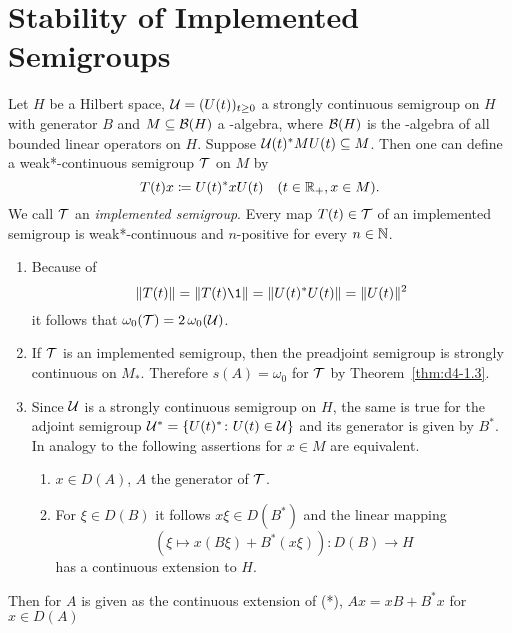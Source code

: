 \section{Stability of Implemented Semigroups}
Let $H$ be a Hilbert space, $\mathcal{U} = (U(t))_{t \geq 0}$ a strongly continuous semigroup on $H$ with generator $B$ and $M \subseteq \mathcal{B}(H)$ a \WA-algebra, where $\mathcal{B}(H)$ is the \WA-algebra of all bounded linear operators on $H$.
Suppose $\mathcal{U}(t)^{*}MU(t) \subseteq M$.
Then one can define a weak*-continuous semigroup $\mathcal{T}$ on $M$ by 
%
\[
	T(t)x \coloneqq U(t)^{*}xU(t) \quad (t \in \mathbb{R}_{+}, x \in M) .
\]
%
We call $\mathcal{T}$ an \emph{implemented semigroup}.
Every map $T(t) \in \mathcal{T}$ of an implemented semigroup is weak*-continuous and $n$-positive for every $n \in \mathbb{N}$.
\begin{remarks}\label{rem:d4-2.1}

\begin{enumerate}
\item\label{item:d4-2.1-i}
Because of
\[
	\|T(t)\| = \|T(t)\1\| = \|U(t)^{*}U(t)\| = \|U(t)\|^2
\]
it follows that $\omega_{0}(\mathcal{T}) = 2\,\omega_{0}(\mathcal{U})$.

\item\label{item:d4-2.1-ii}
If $\mathcal{T}$ is an implemented semigroup, then the preadjoint semigroup is strongly continuous on $M_{*}$.
Therefore $s(A) = \omega_{0}$ for $\mathcal{T}$ by Theorem~\ref{thm:d4-1.3}.

\item\label{item:d4-2.1-iii}
Since $\mathcal{U}$ is a strongly continuous semigroup on $ H $, the same is true for the adjoint semigroup 
$\mathcal{U}^{*} = \{ U(t)^{*} \colon U(t) \in \mathcal{U} \}$ and its generator is given by $B^{*}$.
In analogy to \citet[3.2.55]{brattelirobinson:1979} the following assertions for $x \in M$ are equivalent.
\begin{enumerate}[\upshape (a)]
\item
$x \in D(A)$, $ A $ the generator of $ \mathcal{T} $.

\item
For $\xi \in D(B)$ it follows $x\xi \in D(B^{*})$ and the linear mapping
\begin{equation}
	(\xi \mapsto x(B\xi)+B^{*}(x\xi)): D(B) \to H \tag{*}
\end{equation}
has a continuous extension to $H$.
\end{enumerate}
\end{enumerate}
\end{remarks}
Then for $A$ is given as the continuous extension of (*), \ie 
 $Ax = xB + B^{*}x$ for $ x \in D(A) $

